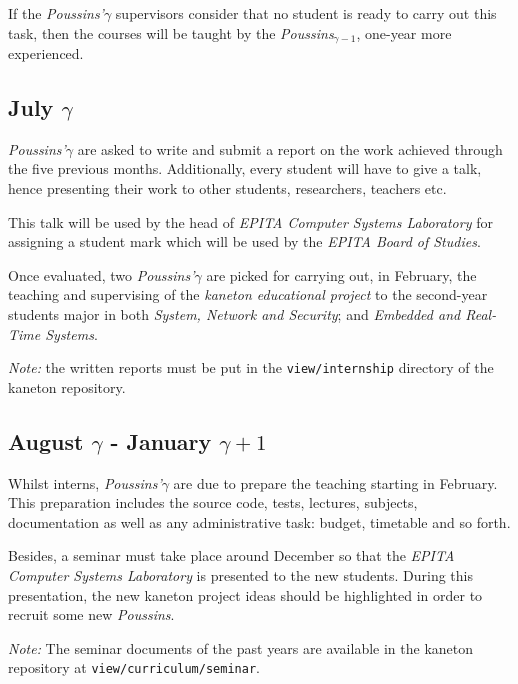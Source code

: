 \begin{multicols}{2}
If the \textit{Poussins'$\gamma$} supervisors consider that no student is
ready to carry out this task, then the courses will be taught by the
\textit{Poussins$_{\gamma - 1}$}, one-year more experienced.

%
%

\subsection{July $\gamma$}

\textit{Poussins'$\gamma$} are asked to write and submit a report on the
work achieved through the five previous months. Additionally, every student
will have to give a talk, hence presenting their work to other students,
researchers, teachers etc.

This talk will be used by the head of \textit{EPITA Computer Systems
Laboratory} for assigning a student mark which will be used by the
\textit{EPITA Board of Studies}.

Once evaluated, two \textit{Poussins'$\gamma$} are picked for carrying out,
in February, the teaching and supervising of the \textit{kaneton educational
project} to the second-year students major in both \textit{System, Network and
Security}; and \textit{Embedded and Real-Time Systems}.

\textit{Note:} the written reports must be put in the \texttt{view/internship}
directory of the kaneton repository.

%
%

\subsection{August $\gamma$ - January $\gamma + 1$}

Whilst interns, \textit{Poussins'$\gamma$} are due to prepare the teaching
starting in February. This preparation includes the source code, tests,
lectures, subjects, documentation as well as any administrative task: budget,
timetable and so forth.

Besides, a seminar must take place around December so that the \textit{EPITA
Computer Systems Laboratory} is presented to the new students. During this
presentation, the new kaneton project ideas should be highlighted in order
to recruit some new \textit{Poussins}.

\textit{Note:} The seminar documents of the past years are available in the
kaneton repository at \texttt{view/curriculum/seminar}.


\end{multicols}
